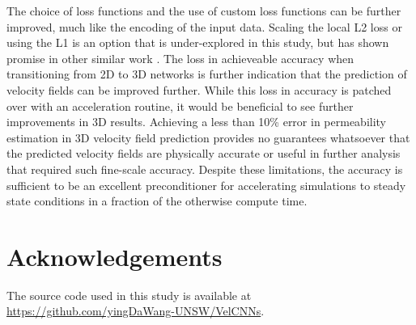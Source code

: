 \documentclass{article}
\begin{document}
The choice of loss functions and the use of custom loss functions can be further improved, much like the encoding of the input data. Scaling the local L2 loss or using the L1 is an option that is under-explored in this study, but has shown promise in other similar work \cite{poreflownet}. The loss in achieveable accuracy when transitioning from 2D to 3D networks is further indication that the prediction of velocity fields can be improved further. While this loss in accuracy is patched over with an acceleration routine, it would be beneficial to see further improvements in 3D results. Achieving a less than 10\% error in permeability estimation in 3D velocity field prediction provides no guarantees whatsoever that the predicted velocity fields are physically accurate or useful in further analysis that required such fine-scale accuracy. Despite these limitations, the accuracy is sufficient to be an excellent preconditioner for accelerating simulations to steady state conditions in a fraction of the otherwise compute time.

\section{Acknowledgements}
The source code used in this study is available at \url{https://github.com/yingDaWang-UNSW/VelCNNs}. 
\end{document}
